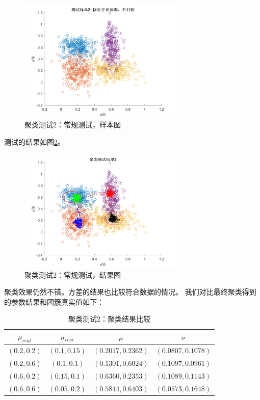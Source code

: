 \begin{figure}[htbp]
   \centering
   \includegraphics[width=0.7\textwidth]{ClusterTest2Sample.png} %
   \caption{聚类测试2：常规测试，样本图}
   \label{fig:clustest2sa}
\end{figure}

测试的结果如图\ref{fig:clustest2re}。

\begin{figure}[htbp]
   \centering
   \includegraphics[width=0.7\textwidth]{ClusterTest2Result.png} %
   \caption{聚类测试2：常规测试，结果图}
   \label{fig:clustest2re}
\end{figure}

聚类效果仍然不错。方差的结果也比较符合数据的情况。
我们对比最终聚类得到的参数结果和团簇真实值如下：
\begin{table}[htbp]
\centering
\begin{tabular}{c|c||c|c}
  \hline
  $\mu_{real}$   &  $\sigma_{real}$ &  $\mu$  &   $\sigma$\\
  \hline
  $(0.2,0.2)$    &  $(0.1,0.15)$   &  $(0.2017, 0.2362)$  & $(0.0807, 0.1078)$ \\
  $(0.2,0.6)$    &  $(0.1,0.1)$   &  $(0.1301, 0.6024)$  & $(0.1097, 0.0961)$ \\
  $(0.6,0.2)$    &  $(0.15,0.1)$   &  $(0.6360, 0.2353)$  & $(0.1089, 0.1143)$ \\
  $(0.6,0.6)$    &  $(0.05,0.2)$   &  $(0.5844, 0.6403)$  & $(0.0573, 0.1648)$ \\
  \hline
\end{tabular}
\caption{聚类测试2：聚类结果比较}
\label{tab:clustest2}
\end{table}


